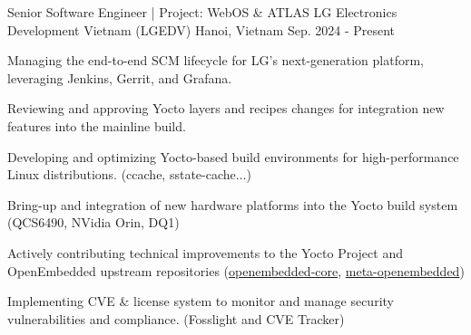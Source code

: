 \begin{cventries}
  \cventry
    {Senior Software Engineer | Project: WebOS \& ATLAS} %
    {LG Electronics Development Vietnam (LGEDV)} %
    {Hanoi, Vietnam} %
    {Sep. 2024 - Present} %
    {
      \begin{cvitems} %
        \item {Managing the end-to-end SCM lifecycle for LG's next-generation platform, leveraging Jenkins, Gerrit, and Grafana.}
        \item {Reviewing and approving Yocto layers and recipes changes for integration new features into the mainline build.}
        \item {Developing and optimizing Yocto-based build environments for high-performance Linux distributions. (ccache, sstate-cache...) }
        \item {Bring-up and integration of new hardware platforms into the Yocto build system (QCS6490, NVidia Orin, DQ1)}
        \item {Actively contributing technical improvements to the Yocto Project and OpenEmbedded upstream repositories (\href{https://git.openembedded.org/openembedded-core/log/?qt=grep\&q=tho3.nguyen\&h=scarthgap}{openembedded-core}, \href{https://git.openembedded.org/meta-openembedded/log/?qt=grep\&q=tho3.nguyen}{meta-openembedded})}
        \item {Implementing CVE \& license system to monitor and manage security vulnerabilities and compliance. (Fosslight and CVE Tracker) }
      \end{cvitems}
    }

\end{cventries}